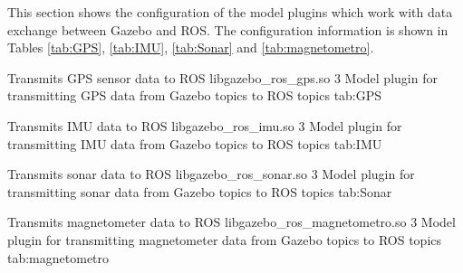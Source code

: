 This section shows the configuration of the model plugins which work with data exchange between Gazebo and ROS. The configuration information is shown in Tables \ref{tab:GPS}, \ref{tab:IMU}, \ref{tab:Sonar} and \ref{tab:magnetometro}.

\begin{plugintable}
	{Transmits GPS sensor data to ROS}
	{libgazebo\_ros\_gps.so}
	{3}
	{Model plugin for transmitting GPS data from Gazebo topics to ROS topics}
	{tab:GPS}
\end{plugintable}

\begin{plugintable}
	{Transmits IMU data to ROS}
	{libgazebo\_ros\_imu.so}
	{3}
	{Model plugin for transmitting IMU data from Gazebo topics to ROS topics}
	{tab:IMU}
\end{plugintable}

\begin{plugintable}
	{Transmits sonar data to ROS}
	{libgazebo\_ros\_sonar.so}
	{3}
	{Model plugin for transmitting sonar data from Gazebo topics to ROS topics}
	{tab:Sonar}
\end{plugintable}

\begin{plugintable}
	{Transmits magnetometer data to ROS}
	{libgazebo\_ros\_magnetometro.so}
	{3}
	{Model plugin for transmitting magnetometer data from Gazebo topics to ROS topics}
	{tab:magnetometro}
\end{plugintable}